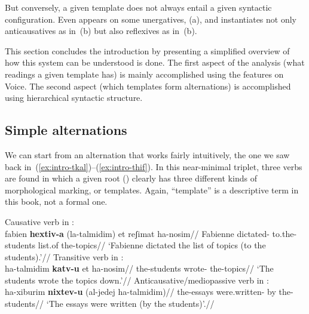 But conversely, a given template does not always entail a given syntactic configuration. Even {\tnif} appears on some unergatives, (\nextx a), and {\thit} instantiates not only anticausatives as in~(\lastx b) but also reflexives as in~(\nextx b).
\ex\label{ex:counter2}
\xe

This section concludes the introduction by presenting a simplified overview of how this system can be understood is done. The first aspect of the analysis (what readings a given template has) is mainly accomplished using the features on Voice. The second aspect (which templates form alternations) is accomplished using hierarchical syntactic structure.

	\subsection{Simple alternations}
We can start from an alternation that works fairly intuitively, the one we saw back in~(\ref{ex:intro-tkal})--(\ref{ex:intro-thif}). In this near-minimal triplet, three verbs are found in which a given root () clearly has three different kinds of morphological marking, or templates. Again, ``template'' is a descriptive term in this book, not a formal one.

\pex\label{ex:general}
	\a Causative verb in {\thif}:\\
		\begingl
		\gla fabien \textbf{hextiv-a} (la-talmidim) et reʃimat ha-nosim//
		\glb Fabienne dictated- to.the-students  list.of the-topics//
		\glft `Fabienne dictated the list of topics (to the students).'//
	\endgl	
	\a Transitive verb in {\tkal}:\\
		\begingl
		\gla ha-talmidim \textbf{katv-u} et ha-nosim//
		\glb the-students wrote-  the-topics//
		\glft `The students wrote the topics down.'//
	\endgl
	\a Anticausative/mediopassive verb in {\tnif}:\\
		\begingl
		\gla ha-xiburim \textbf{nixtev-u} (al-jedej ha-talmidim)//
		\glb the-essays were.written- by the-students//
		\glft `The essays were written (by the students)'.//
	\endgl
\xe

